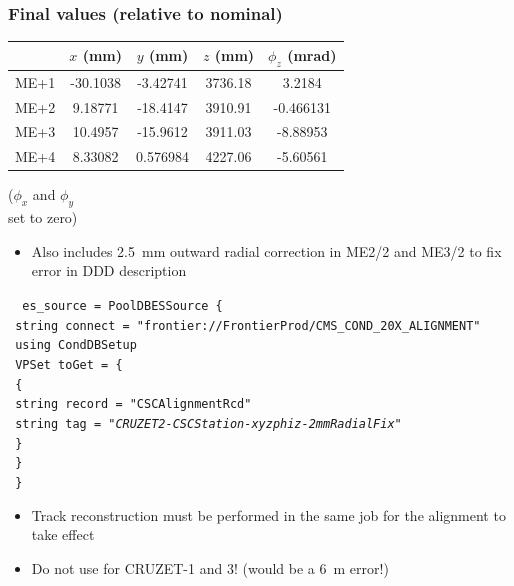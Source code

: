 \documentclass[compress]{beamer}
\begin{document}
\begin{frame}
\frametitle{Final values (relative to nominal)}

\small
\renewcommand{\arraystretch}{1.2}
\begin{tabular}{c | c c c c}
& $x$ (mm) & $y$ (mm) & $z$ (mm) & $\phi_z$ (mrad) \\\hline
ME+1 & -30.1038 & -3.42741 & 3736.18 & 3.2184 \\
ME+2 & 9.18771 & -18.4147 & 3910.91 & -0.466131 \\
ME+3 & 10.4957 & -15.9612 & 3911.03 & -8.88953 \\
ME+4 & 8.33082 & 0.576984 & 4227.06 & -5.60561 \\
\end{tabular} \hfill \begin{minipage}{2 cm} ($\phi_x$ and $\phi_y$ \\ set to zero) \end{minipage}

\vfill
\begin{itemize}
\item Also includes 2.5~mm outward radial correction in ME2/2 and ME3/2 to
fix error in DDD description
\end{itemize}

\vspace{-0.5 cm}
\begin{center}
\begin{minipage}{0.75\linewidth}
\tiny
\tt
\mbox{ }es\_source = PoolDBESSource \{ \\
\mbox{ }\hspace{0.5 cm}string connect = "frontier://FrontierProd/CMS\_COND\_20X\_ALIGNMENT" \\
\mbox{ }\hspace{0.5 cm}using CondDBSetup \\
\mbox{ }\hspace{0.5 cm}VPSet toGet = \{ \\
\mbox{ }\hspace{1.0 cm}\{ \\
\mbox{ }\hspace{1.5 cm}string record = "CSCAlignmentRcd" \\
\mbox{ }\hspace{1.5 cm}string tag = {\it "CRUZET2-CSCStation-xyzphiz-2mmRadialFix" } \\
\mbox{ }\hspace{1.0 cm}\} \\
\mbox{ }\hspace{0.5 cm}\} \\
\mbox{ }\} \\
\end{minipage}
\end{center}

\vspace{-0.5 cm}
\begin{itemize}
\item Track reconstruction must be performed in the same job for the alignment to take effect
\item Do not use for CRUZET-1 and 3!  (would be a 6~m error!)
\end{itemize}

\end{frame}
\end{document}
